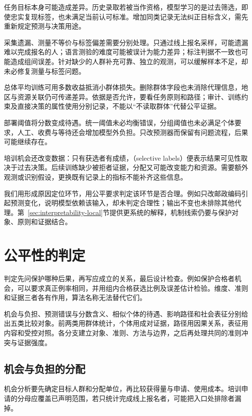 任务目标本身可能造成差异。历史录取若被当作资格，模型学习的是过去筛选，即使忠实复现标签，也未满足当前认可标准。增加同类记录无法纠正目标含义，需先重新规定预测与决策用途。

采集遗漏、测量不等价与标签偏差需要分别处理。只通过线上报名采样，可能遗漏难以完成报名的人；语言测验的难度可能被误计为能力差异；标注判据不一致也可能造成组间误差。针对缺少的人群补充可靠、独立的观测，可以缓解样本不足，却未必修复测量与标签问题。

总体平均训练可用多数收益抵消小群体损失。删除群体字段也未消除代理信息，地区与资源关联仍可传递差异。依据是否允许，要看任务原则和路径；审计、训练约束及直接决策的属性使用分别记录，不能以“不读取群体”代替公平证据。

部署阈值将分数变成待遇。统一阈值未必均衡错误，分组阈值也未必满足个体要求，人工、收费与等待还会增加模型外负担。只改预测器而保留有问题流程，后果可能继续存在。

培训机会还改变数据：只有获选者有成绩，（selective labels）便表示结果可见性取决于过去决策。后续训练缺少被拒者证据，分配又可能改变能力和资源。需要额外观测或识别假设，更换既有记录上的指标不能补齐这些信息。

我们用形成原因定位环节，用公平要求判定该环节是否合理。例如只改邮政编码引起预测变化，说明模型依赖该输入，却未判定合理性；输出不变也未排除其他代理。第~\ref{sec:interpretability-local}节提供更系统的解释，机制线索仍要与保护对象、原则和证据结合。

\section{公平性的判定}
\label{sec:fairness-criteria}

判定先问保护哪种后果，再写应成立的关系，最后设计检查。例如保护合格者机会，可以要求真正例率相同，并用组内合格获选比例及误差估计检验。维度、准则和证据三者各有作用，算法名称无法替代它们。

机会与负担、预测错误与分数含义、相似个体的待遇、影响路径和社会表征分别给出五类比较对象。前两类用群体统计，个体用成对证据，路径用因果关系，表征用内容和受控对照。各分支建立对象、准则、方法与边界，之后再处理共同的准则冲突与证据强度。

\subsection{机会与负担的分配}
\label{sec:fairness-group-comparison}

机会分析要先确定目标人群和分配单位，再比较获得量与申请、使用成本。培训申请的分母应覆盖已声明范围，若只统计完成线上报名者，可能把入口处排除者漏掉。

